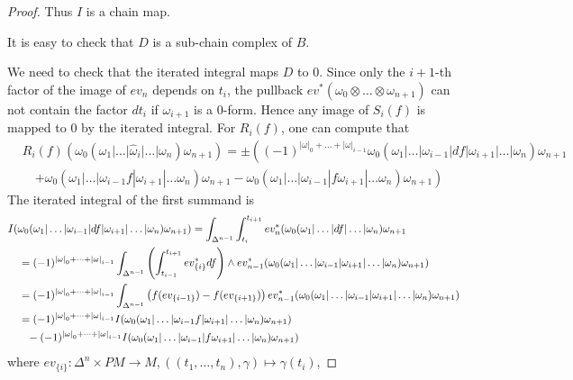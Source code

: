 \documentclass{scrartcl}
\theoremstyle{plain}
\theoremstyle{definition}
\newcommand{\abs}[1]{\left\lvert#1\right\rvert}
\begin{document}
\begin{proof}
    Thus $I$ is a chain map. 

    It is easy to check that $D$ is a sub-chain complex of $B$. 

    We need to check that the iterated integral maps $D$ to $0$. Since only the $i+1$-th factor of the image of $ev_n$ depends on $t_i$, the pullback $ev^*(\omega_0\otimes\dots\otimes\omega_{n+1})$ can not contain the factor $dt_i$ if $\omega_{i+1}$ is a $0$-form. Hence any image of $S_i(f)$ is mapped to $0$ by the iterated integral. For $R_i(f)$, one can compute that  
    \begin{align*}
        &R_i(f)(\omega_0(\omega_1|\dots|\hat\omega_i|\dots|\omega_{n})\omega_{n+1}) = \pm \left( (-1)^{\abs\omega_0+\dots+\abs\omega_{i-1}} \omega_0(\omega_1|\dots| \omega_{i-1}| df| \omega_{i+1}|\dots|\omega_{n})\omega_{n+1} \right.\\&\quad\left. + \omega_0(\omega_1|\dots|\omega_{i-1}f|\omega_{i+1}|\dots\omega_n)\omega_{n+1} - \omega_0(\omega_1|\dots|\omega_{i-1}|f\omega_{i+1}|\dots\omega_n)\omega_{n+1} \right)
    \end{align*}
    The iterated integral of the first summand is 
    \begin{align*}
        &I(\omega_0(\omega_1|\dots| \omega_{i-1}| df| \omega_{i+1}|\dots|\omega_{n})\omega_{n+1}) = \int_{\Delta^{n-1}}\int_{t_i}^{t_{i+1}} ev_{n}^*(\omega_0(\omega_1|\dots|df|\dots|\omega_n)\omega_{n+1} \\
        &\quad= (-1)^{\abs\omega_0+\dots+\abs\omega_{i-1}}\int_{\Delta^{n-1}}\left(\int_{t_{i-1}}^{t_{i+1}} ev_{\{i\}}^*df\right) \wedge ev_{n-1}^*(\omega_0(\omega_1|\dots|\omega_{i-1}|\omega_{i+1}|\dots|\omega_n)\omega_{n+1}) \\
        &\quad= (-1)^{\abs\omega_0+\dots+\abs\omega_{i-1}}\int_{\Delta^{n-1}}\left(f(ev_{\{i-1\}})-f(ev_{\{i+1\}})\right) ev_{n-1}^*(\omega_0(\omega_1|\dots|\omega_{i-1}|\omega_{i+1}|\dots|\omega_n)\omega_{n+1}) \\
        &\quad= (-1)^{\abs\omega_0+\dots+\abs\omega_{i-1}} I(\omega_0(\omega_1|\dots|\omega_{i-1} f|\omega_{i+1}|\dots|\omega_{n})\omega_{n+1}) \\
        &\quad\hphantom{= }-(-1)^{\abs\omega_0+\dots+\abs\omega_{i-1}} I(\omega_0(\omega_1|\dots|\omega_{i-1} |f\omega_{i+1}|\dots|\omega_{n})\omega_{n+1})
    \end{align*}
    where $ev_{\{i\}}\colon \Delta^n\times PM\to M, \left((t_1, \dots, t_n), \gamma\right)\mapsto \gamma(t_i)$,
\end{proof}
\end{document}
